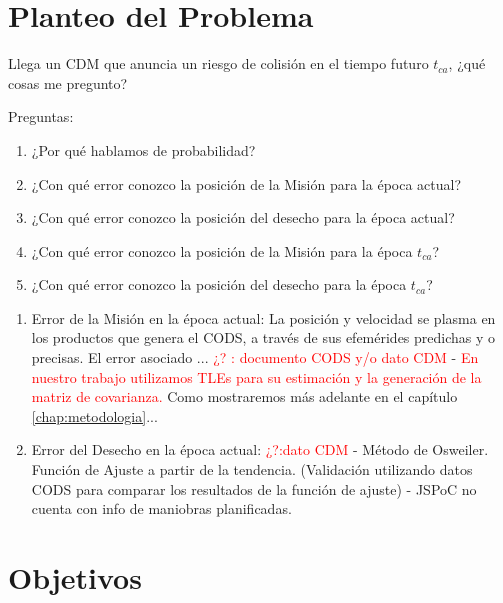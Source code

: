 {\section{Planteo del Problema}

Llega un CDM que anuncia un riesgo de colisi\'on en el tiempo futuro $t_{ca}$, ¿qu\'e cosas me pregunto?

Preguntas:\\

\begin{enumerate}
 \item ¿Por qu\'e hablamos de probabilidad?
 \item ¿Con qu\'e error conozco la posici\'on de la Misi\'on para la \'epoca actual?\\
 \item ¿Con qu\'e error conozco la posici\'on del desecho para la \'epoca actual?\\
 \item ¿Con qu\'e error conozco la posici\'on de la Misi\'on para la \'epoca $t_{ca}$?\\
 \item ¿Con qu\'e error conozco la posici\'on del desecho para la \'epoca $t_{ca}$?\\
\end{enumerate}

\begin{enumerate}
 \item Error de la Misi\'on en la \'epoca actual: La posici\'on y velocidad se plasma en los productos que genera el CODS, a trav\'es de sus efem\'erides predichas y o precisas. El error asociado ... {\textcolor{red}{¿? : documento CODS y/o dato CDM}} - {\textcolor{red}{En nuestro trabajo utilizamos TLEs para su estimaci\'on y la generaci\'on de la matriz de covarianza.}} Como mostraremos m\'as adelante en el capítulo \ref{chap:metodologia}...\\
 \item Error del Desecho en la \'epoca actual: {\textcolor{red}{¿?:dato CDM}} - M\'etodo de Osweiler. Funci\'on de Ajuste a partir de la tendencia. (Validaci\'on utilizando datos CODS para comparar los resultados de la funci\'on de ajuste) - JSPoC no cuenta con info de maniobras planificadas.
 
\end{enumerate}





\section{Objetivos}

}
